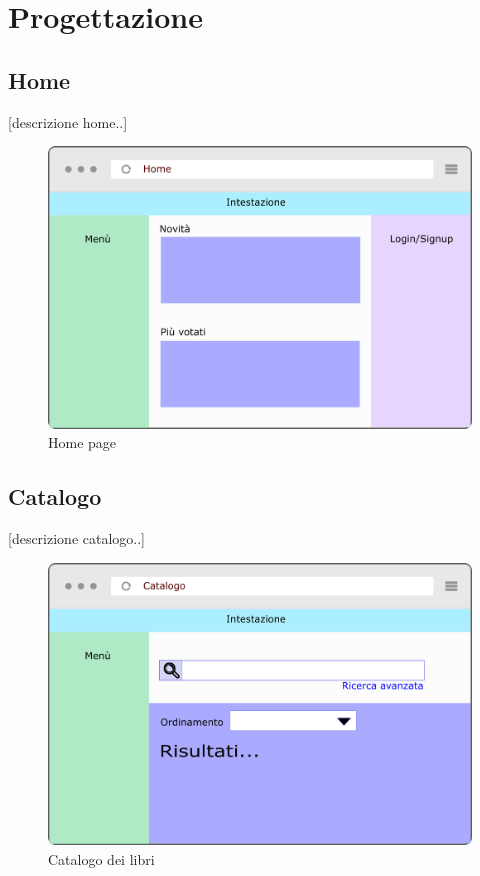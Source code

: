 \section{Progettazione}

\subsection{Home}
[descrizione home..]
\begin{figure}[H]
	\centering
	\includegraphics[width= 14cm]{immagini/home.png}
	\caption{Home page}
\end{figure}

\subsection{Catalogo}
[descrizione catalogo..]
\begin{figure}[H]
	\centering
	\includegraphics[width= 14cm]{immagini/catalogo.png}
	\caption{Catalogo dei libri}
\end{figure}

